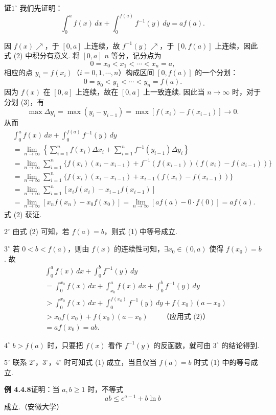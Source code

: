 \documentclass[UTF8, 12pt, fontset=fandol, oneside]{ctexart}
\begin{document}
\noindent\textbf{证}\quad $1^\circ$ 我们先证明：
\[
\int_0^a f(x)\,dx+\int_0^{f(a)}f^{-1}(y)\,dy=af(a). \tag{2}
\]

因 $f(x)\nearrow$，于 $[0,a]$ 上连续，故 $f^{-1}(y)\nearrow$，于 $[0,f(a)]$ 上连续，因此式 (2) 中积分有意义. 将 $[0,a]$ $n$ 等分，记分点为
\[
0=x_0<x_1<\cdots<x_n=a,
\]
相应的点 $y_i=f(x_i)$（$i=0,1,\cdots,n$）构成区间 $[0,f(a)]$ 的一个分划：
\[
0=y_0<y_1<\cdots<y_n=f(a). \tag{3}
\]
因为 $f(x)$ 在 $[0,a]$ 上连续，故在 $[0,a]$ 上一致连续. 因此当 $n\to\infty$ 时，对于分划 (3)，有
\[
\max \Delta y_i=\max (y_i-y_{i-1})
=\max[f(x_i)-f(x_{i-1})]\to0.
\]
从而
\[
\begin{aligned}
&\int_0^a f(x)\,dx+\int_0^{f(a)}f^{-1}(y)\,dy\\
&=\lim_{n\to\infty}\left\{\sum_{i=1}^n f(x_i)\Delta x_i
+\sum_{i=1}^n f^{-1}(y_{i-1})\Delta y_i\right\}\\
&=\lim_{n\to\infty}\sum_{i=1}^n
\{f(x_i)(x_i-x_{i-1})+f^{-1}(f(x_{i-1}))(f(x_i)-f(x_{i-1}))\}\\
&=\lim_{n\to\infty}\sum_{i=1}^n
\{f(x_i)(x_i-x_{i-1})+x_{i-1}(f(x_i)-f(x_{i-1}))\}\\
&=\lim_{n\to\infty}\sum_{i=1}^n[x_i f(x_i)-x_{i-1}f(x_{i-1})]\\
&=\lim_{n\to\infty}[x_n f(x_n)-x_0 f(x_0)]
=\lim_{n\to\infty}[af(a)-0\cdot f(0)]=af(a).
\end{aligned}
\]
式 (2) 获证.

$2^\circ$ 由式 (2) 可知，若 $f(a)=b$，则式 (1) 中等号成立.

$3^\circ$ 若 $0<b<f(a)$，则由 $f(x)$ 的连续性可知，$\exists x_0\in(0,a)$ 使得 $f(x_0)=b$. 故
\[
\begin{aligned}
&\int_0^a f(x)\,dx+\int_0^b f^{-1}(y)\,dy\\
&=\int_0^{x_0}f(x)\,dx+\int_{x_0}^a f(x)\,dx+\int_0^b f^{-1}(y)\,dy\\
&>\int_0^{x_0}f(x)\,dx+\int_0^{f(x_0)}f^{-1}(y)\,dy+f(x_0)(a-x_0)\\
&>x_0f(x_0)+f(x_0)(a-x_0)\qquad\text{（应用式 (2)）}\\
&=af(x_0)=ab.
\end{aligned}
\]

$4^\circ$ $b>f(a)$ 时，只要把 $f(x)$ 看作 $f^{-1}(y)$ 的反函数，就可由 $3^\circ$ 的结论得到.

$5^\circ$ 联系 $2^\circ$，$3^\circ$，$4^\circ$ 时可知式 (1) 成立，当且仅当 $f(a)=b$ 时式 (1) 中的等号成立.

\noindent\textbf{例 4.4.8}\quad 证明：当 $a,b\ge1$ 时，不等式
\[
ab\le e^{a-1}+b\ln b
\]
成立.（安徽大学）
\end{document}
